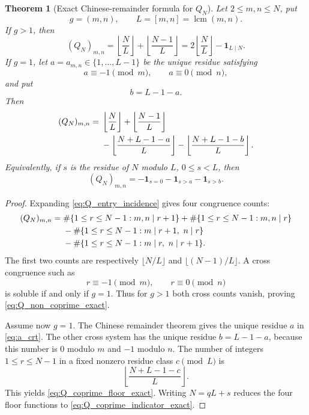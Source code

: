 \documentclass[11pt]{amsart}
\numberwithin{equation}{section}
\theoremstyle{plain}
\newtheorem{theorem}{Theorem}[section]
\theoremstyle{definition}
\theoremstyle{remark}
\begin{document}
\begin{theorem}[Exact Chinese-remainder formula for $Q_N$]
\label{thm:Q_exact_CRT}
Let $2\le m,n\le N$, put
\begin{equation}
g=(m,n),
\qquad
L=[m,n]=\operatorname{lcm}(m,n).
\end{equation}
If $g>1$, then
\begin{equation}
(Q_N)_{m,n}
=\left\lfloor\frac NL\right\rfloor
 +\left\lfloor\frac{N-1}{L}\right\rfloor
=2\left\lfloor\frac NL\right\rfloor-\mathbf 1_{L\mid N}.
\label{eq:Q_non_coprime_exact}
\end{equation}
If $g=1$, let $a=a_{m,n}\in\{1,\ldots,L-1\}$ be the unique residue satisfying
\begin{equation}
a\equiv-1\pmod m,
\qquad
a\equiv0\pmod n,
\label{eq:a_crt}
\end{equation}
and put
\begin{equation}
b=L-1-a.
\label{eq:b_crt}
\end{equation}
Then
\begin{align}
(Q_N)_{m,n}
={}&\left\lfloor\frac NL\right\rfloor
+\left\lfloor\frac{N-1}{L}\right\rfloor\notag\\
&-\left\lfloor\frac{N+L-1-a}{L}\right\rfloor
-\left\lfloor\frac{N+L-1-b}{L}\right\rfloor.
\label{eq:Q_coprime_floor_exact}
\end{align}
Equivalently, if $s$ is the residue of $N$ modulo $L$, $0\le s<L$, then
\begin{equation}
(Q_N)_{m,n}
=-\mathbf 1_{s=0}-\mathbf 1_{s>a}-\mathbf 1_{s>b}.
\label{eq:Q_coprime_indicator_exact}
\end{equation}
\end{theorem}

\begin{proof}
Expanding \eqref{eq:Q_entry_incidence} gives four congruence counts:
\begin{align}
(Q_N)_{m,n}
={}&\#\{1\le r\le N-1:m,n\mid r+1\}
+\#\{1\le r\le N-1:m,n\mid r\}\notag\\
&-\#\{1\le r\le N-1:m\mid r+1,\ n\mid r\}\notag\\
&-\#\{1\le r\le N-1:m\mid r,\ n\mid r+1\}.
\label{eq:Q_four_counts}
\end{align}
The first two counts are respectively $\lfloor N/L\rfloor$ and $\lfloor(N-1)/L\rfloor$.  A cross congruence such as
\begin{equation}
r\equiv-1\pmod m,
\qquad r\equiv0\pmod n
\end{equation}
is soluble if and only if $g=1$.  Thus for $g>1$ both cross counts vanish, proving \eqref{eq:Q_non_coprime_exact}.

Assume now $g=1$.  The Chinese remainder theorem gives the unique residue $a$ in \eqref{eq:a_crt}.  The other cross system has the unique residue $b=L-1-a$, because this number is $0$ modulo $m$ and $-1$ modulo $n$.  The number of integers $1\le r\le N-1$ in a fixed nonzero residue class $c\pmod L$ is
\begin{equation}
\left\lfloor\frac{N+L-1-c}{L}\right\rfloor.
\end{equation}
This yields \eqref{eq:Q_coprime_floor_exact}.  Writing $N=qL+s$ reduces the four floor functions to \eqref{eq:Q_coprime_indicator_exact}.
\end{proof}
\end{document}

